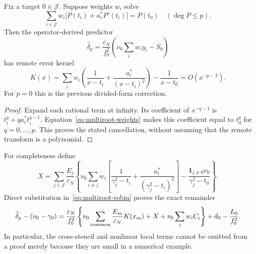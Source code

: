 \begin{proposition}
\label{prop:multiroot-cancellation}
Fix a target $0\in\mathcal J$. Suppose weights $w_i$ solve
\begin{equation}\label{eq:multiroot-weights}
 \sum_{i\in\mathcal J}w_i\bigl[P(t_i)+a_i^*P'(t_i)\bigr]=P(t_0)
 \quad(\deg P\le p).
\end{equation}
Then the operator-derived predictor
\begin{equation}\label{eq:multiroot-predictor}
 \widehat\delta_p=\frac{\varepsilon_N}{f_0^2}
              \left(\nu_0\sum_i w_i y_i-S_0\right)
\end{equation}
has remote error kernel
\begin{equation}\label{eq:multiroot-kernel}
 K(x)=\sum_i w_i\left(\frac1{x-t_i}+\frac{a_i^*}{(x-t_i)^2}\right)
                  -\frac1{x-t_0}=O(x^{-p-2}).
\end{equation}
For $p=0$ this is the previous divided-form correction.
\end{proposition}
\begin{proof}
Expand each rational term at infinity. Its coefficient of $x^{-q-1}$ is
$t_i^q+q a_i^*t_i^{q-1}$. Equation~\eqref{eq:multiroot-weights} makes this
coefficient equal to $t_0^q$ for $q=0,\ldots,p$. This proves the stated
cancellation, without assuming that the remote transform is a polynomial.
\end{proof}

For completeness define
\[
 X=\sum_{j\in\mathcal J}\frac{E_j}{\varepsilon_N}
 \left\{\nu_0\sum_{i\ne j}w_i
 \left[\frac1{\gamma_j^2-t_i}+\frac{a_i^*}{(\gamma_j^2-t_i)^2}\right]
       -\frac{\mathbf1_{j\ne0}\nu_0}{\gamma_j^2-t_0}\right\}.
\]
Direct substitution in~\eqref{eq:multiroot-robin} proves the exact remainder
\begin{equation}\label{eq:multiroot-remainder}
 \widehat\delta_p-(\nu_0-\gamma_0)=
 \frac{\varepsilon_N}{f_0^2}
 \left\{\nu_0\sum_{\rm common}\frac{E_m}{\varepsilon_N}K(x_m)
                +X+\nu_0\sum_iw_iC_i\right\}
                  +d_0-\frac{L_0}{f_0^2}.
\end{equation}
In particular, the cross-stencil and nonlinear local terms cannot be omitted
from a proof merely because they are small in a numerical example.

